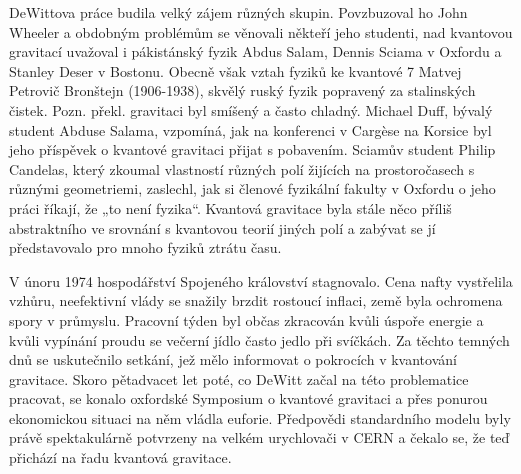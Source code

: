   DeWittova práce budila velký zájem různých skupin. Povzbuzoval ho John Wheeler a obdobným
  problémům se věnovali někteří jeho studenti, nad kvantovou gravitací uvažoval i pákistánský fyzik
  Abdus Salam, Dennis Sciama v Oxfordu a Stanley Deser v Bostonu. Obecně však vztah fyziků ke
  kvantové 7 Matvej Petrovič Bronštejn (1906-1938), skvělý ruský fyzik popravený za stalinských
  čistek. Pozn. překl. gravitaci byl smíšený a často chladný. Michael Duff, bývalý student Abduse
  Salama, vzpomíná, jak na konferenci v Cargèse na Korsice byl jeho příspěvek o kvantové gravitaci
  přijat s pobavením. Sciamův student Philip Candelas, který zkoumal vlastností různých polí
  žijících na prostoročasech s různými geometriemi, zaslechl, jak si členové fyzikální fakulty v
  Oxfordu o jeho práci říkají, že „to není fyzika“. Kvantová gravitace byla stále něco příliš
  abstraktního ve srovnání s kvantovou teorií jiných polí a zabývat se jí představovalo pro mnoho
  fyziků ztrátu času. 
  
  V únoru 1974 hospodářství Spojeného království stagnovalo. Cena nafty vystřelila vzhůru,
  neefektivní vlády se snažily brzdit rostoucí inflaci, země byla ochromena spory v průmyslu.
  Pracovní týden byl občas zkracován kvůli úspoře energie a kvůli vypínání proudu se večerní jídlo
  často jedlo při svíčkách. Za těchto temných dnů se uskutečnilo setkání, jež mělo informovat o
  pokrocích v kvantování gravitace. Skoro pětadvacet let poté, co DeWitt začal na této problematice
  pracovat, se konalo oxfordské Symposium o kvantové gravitaci a přes ponurou ekonomickou situaci na
  něm vládla euforie. Předpovědi standardního modelu byly právě spektakulárně potvrzeny na velkém
  urychlovači v CERN a čekalo se, že teď přichází na řadu kvantová gravitace.
  
